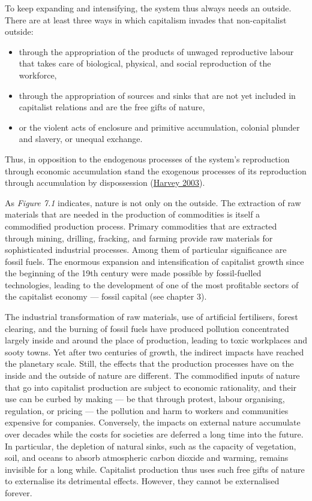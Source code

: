 \documentclass[a4paper, nobind]{templates/ociamthesis}
\providecommand{\tightlist}{%
  \setlength{\itemsep}{0pt}\setlength{\parskip}{0pt}}
\begin{document}
To keep expanding and intensifying, the system thus always needs an outside. There are at least three ways in which capitalism invades that non-capitalist outside:

\begin{itemize}
\tightlist
\item
  through the appropriation of the products of unwaged reproductive labour that takes care of biological, physical, and social reproduction of the workforce,
\item
  through the appropriation of sources and sinks that are not yet included in capitalist relations and are the free gifts of nature,
\item
  or the violent acts of enclosure and primitive accumulation, colonial plunder and slavery, or unequal exchange.
\end{itemize}

Thus, in opposition to the endogenous processes of the system's reproduction through economic accumulation stand the exogenous processes of its reproduction through accumulation by dispossession (\protect\hyperlink{ref-harvey_new_2003}{Harvey 2003}).

As \emph{Figure 7.1} indicates, nature is not only on the outside. The extraction of raw materials that are needed in the production of commodities is itself a commodified production process. Primary commodities that are extracted through mining, drilling, fracking, and farming provide raw materials for sophisticated industrial processes. Among them of particular significance are fossil fuels. The enormous expansion and intensification of capitalist growth since the beginning of the 19th century were made possible by fossil-fuelled technologies, leading to the development of one of the most profitable sectors of the capitalist economy --- fossil capital (see chapter 3).

The industrial transformation of raw materials, use of artificial fertilisers, forest clearing, and the burning of fossil fuels have produced pollution concentrated largely inside and around the place of production, leading to toxic workplaces and sooty towns. Yet after two centuries of growth, the indirect impacts have reached the planetary scale. Still, the effects that the production processes have on the inside and the outside of nature are different. The commodified inputs of nature that go into capitalist production are subject to economic rationality, and their use can be curbed by making --- be that through protest, labour organising, regulation, or pricing --- the pollution and harm to workers and communities expensive for companies. Conversely, the impacts on external nature accumulate over decades while the costs for societies are deferred a long time into the future. In particular, the depletion of natural sinks, such as the capacity of vegetation, soil, and oceans to absorb atmospheric carbon dioxide and warming, remains invisible for a long while. Capitalist production thus uses such free gifts of nature to externalise its detrimental effects. However, they cannot be externalised forever.
\end{document}
